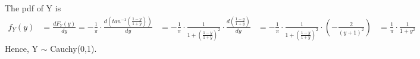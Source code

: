 \documentclass[journal,12pt,twocolumn]{IEEEtran}
\begin{document}
The pdf of Y is
\begin{align}
    f_{Y}(y) &= \frac{d F_{Y}(y)}{dy} = -\frac{1}{\pi}\cdot\frac{d\left(tan^{-1}\left({\frac{1-y}{1+y}}\right)\right)}{dy}
             &= -\frac{1}{\pi}\cdot\frac{1}{1+\left(\frac{1-y}{1+y}\right)^{2}}\cdot\frac{d\left({\frac{1-y}{1+y}}\right)}{dy}
             &= -\frac{1}{\pi}\cdot\frac{1}{1+\left(\frac{1-y}{1+y}\right)^{2}}\cdot\left( -\frac{2}{\left(y + 1\right)^{2}}\right)
             &= \frac{1}{\pi}\cdot \frac{1}{1+y^2}
\end{align}
Hence,  Y $\sim$ Cauchy(0,1).\\
\end{document}
